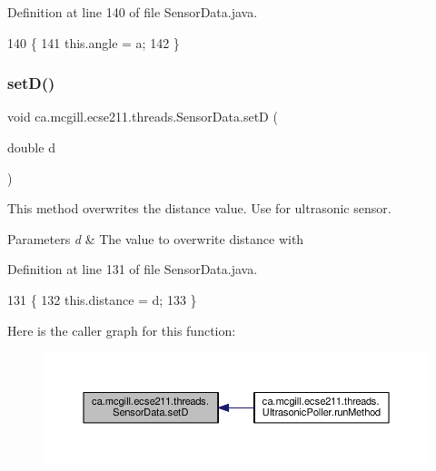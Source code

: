 Definition at line 140 of file Sensor\+Data.\+java.


\begin{DoxyCode}
140                              \{
141     this.angle = a;
142   \}
\end{DoxyCode}
\mbox{\label{classca_1_1mcgill_1_1ecse211_1_1threads_1_1_sensor_data_a2c1f8e625478b89aabe6e9911e482ef3}} 
\subsubsection{\texorpdfstring{set\+D()}{setD()}}
{\footnotesize\ttfamily void ca.\+mcgill.\+ecse211.\+threads.\+Sensor\+Data.\+setD (\begin{DoxyParamCaption}\item[{double}]{d }\end{DoxyParamCaption})}

This method overwrites the distance value. Use for ultrasonic sensor.


\begin{DoxyParams}{Parameters}
{\em d} & The value to overwrite distance with \\
\hline
\end{DoxyParams}


Definition at line 131 of file Sensor\+Data.\+java.


\begin{DoxyCode}
131                              \{
132     this.distance = d;
133   \}
\end{DoxyCode}
Here is the caller graph for this function\+:\nopagebreak
\begin{figure}[H]
\begin{center}
\leavevmode
\includegraphics[width=350pt]{classca_1_1mcgill_1_1ecse211_1_1threads_1_1_sensor_data_a2c1f8e625478b89aabe6e9911e482ef3_icgraph}
\end{center}
\end{figure}
\mbox{\label{classca_1_1mcgill_1_1ecse211_1_1threads_1_1_sensor_data_af905a6f2825716ae1a39bf7f6be09477}} 

